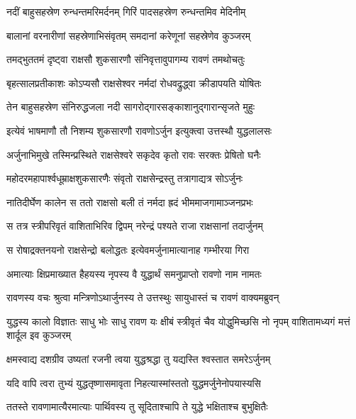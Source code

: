 \twolineshloka
{नदीं बाहुसहस्रेण रुन्धन्तमरिमर्दनम्}
{गिरिं पादसहस्रेण रुन्धन्तमिव मेदिनीम्} %

\twolineshloka
{बालानां वरनारीणां सहस्रेणाभिसंवृतम्}
{समदानां करेणूनां सहस्रेणेव कुञ्जरम्} %

\twolineshloka
{तमद्भुततमं दृष्ट्वा राक्षसौ शुकसारणौ}
{संनिवृत्तावुपागम्य रावणं तमथोचतुः} %

\twolineshloka
{बृहत्सालप्रतीकाशः कोऽप्यसौ राक्षसेश्वर}
{नर्मदां रोधवद्रुद्ध्वा क्रीडापयति योषितः} %

\twolineshloka
{तेन बाहुसहस्रेण संनिरुद्धजला नदी}
{सागरोद्गारसङ्काशानुद्गारान्सृजते मुहुः} %

\twolineshloka
{इत्येवं भाषमाणौ तौ निशम्य शुकसारणौ}
{रावणोऽर्जुन इत्युक्त्वा उत्तस्थौ युद्धलालसः} %

\twolineshloka
{अर्जुनाभिमुखे तस्मिन्प्रस्थिते राक्षसेश्वरे}
{सकृदेव कृतो रावः सरक्तः प्रेषितो घनैः} %

\twolineshloka
{महोदरमहापार्श्वधूम्राक्षशुकसारणैः}
{संवृतो राक्षसेन्द्रस्तु तत्रागाद्यत्र सोऽर्जुनः} %

\twolineshloka
{नातिदीर्घेण कालेन स ततो राक्षसो बली}
{तं नर्मदा ह्रदं भीममाजगामाञ्जनप्रभः} %

\twolineshloka
{स तत्र स्त्रीपरिवृतं वाशिताभिरिव द्विपम्}
{नरेन्द्रं पश्यते राजा राक्षसानां तदार्जुनम्} %

\twolineshloka
{स रोषाद्रक्तनयनो राक्षसेन्द्रो बलोद्धतः}
{इत्येवमर्जुनामात्यानाह गम्भीरया गिरा} %

\twolineshloka
{अमात्याः क्षिप्रमाख्यात हैहयस्य नृपस्य वै}
{युद्धार्थं समनुप्राप्तो रावणो नाम नामतः} %

\twolineshloka
{रावणस्य वचः श्रुत्वा मन्त्रिणोऽथार्जुनस्य ते}
{उत्तस्थुः सायुधास्तं च रावणं वाक्यमब्रुवन्} %

\threelineshloka
{युद्धस्य कालो विज्ञातः साधु भोः साधु रावण}
{यः क्षीबं स्त्रीवृतं चैव योद्धुमिच्छसि नो नृपम्}
{वाशितामध्यगं मत्तं शार्दूल इव कुञ्जरम्} %

\twolineshloka
{क्षमस्वाद्य दशग्रीव उष्यतां रजनी त्वया}
{युद्धश्रद्धा तु यद्यस्ति श्वस्तात समरेऽर्जुनम्} %

\twolineshloka
{यदि वापि त्वरा तुभ्यं युद्धतृष्णासमावृता}
{निहत्यास्मांस्ततो युद्धमर्जुनेनोपयास्यसि} %

\twolineshloka
{ततस्ते रावणामात्यैरमात्याः पार्थिवस्य तु}
{सूदिताश्चापि ते युद्धे भक्षिताश्च बुभुक्षितैः} %

